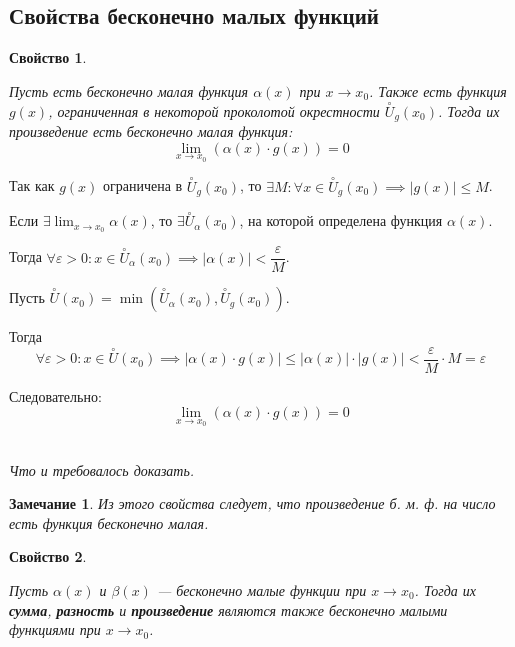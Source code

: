 \documentclass[a4paper,12pt,oneside]{extbook}
\newcommand{\newpar}{$ $\par\nobreak\ignorespaces}
\theoremstyle{numbered}
\newtheorem{property}{Свойство}[section]
\theoremstyle{unnumbered}
\theoremstyle{named}
\theoremstyle{unnumbered}
\theoremstyle{named}
\theoremstyle{named}
\theoremstyle{named}
\newtheorem*{note}{Замечание}
\renewenvironment{proof}[1][]{\breakenv[Доказательство]{\if\relax\detokenize{#1}\relax\else\;\fi}{\textbf{#1}}}{\smallskip\newpar \hfill\textit{Что и требовалось доказать.}}
\begin{document}
\subsection{Свойства бесконечно малых функций}

\begin{property}
    \newpar
    Пусть есть бесконечно малая функция \(\alpha(x)\) при \(x \to x_0\). Также есть функция \(g(x)\), ограниченная в некоторой проколотой окрестности \(\overset{\circ}{U}_g(x_0)\). Тогда их произведение есть бесконечно малая функция:
    \[
        \lim_{x \to x_0}{(\alpha(x) \cdot g(x))} = 0
    \]
\end{property}

\begin{proof}
    Так как \(g(x)\) ограничена в \(\overset{\circ}{U}_g(x_0)\), то \(\exists M: \forall x \in \overset{\circ}{U}_g(x_0) \implies |g(x)| \leq M\).

    Если \(\displaystyle \exists \lim_{x \to x_0}{\alpha(x)}\), то \(\exists \overset{\circ}{U}_\alpha (x_0)\), на которой определена функция \(\alpha(x)\).

    Тогда \(\forall \varepsilon > 0: x \in \overset{\circ}{U}_\alpha(x_0) \implies |\alpha(x)| < \dfrac{\varepsilon}{M}\).

    Пусть \(\overset{\circ}{U}(x_0) = \min(\overset{\circ}{U}_\alpha(x_0), \overset{\circ}{U}_g(x_0))\).

    Тогда
    \[
        \forall \varepsilon > 0: x \in \overset{\circ}{U}(x_0) \implies |\alpha(x) \cdot g(x)| \leq |\alpha(x)| \cdot |g(x)| < \dfrac{\varepsilon}{M} \cdot M = \varepsilon
    \]


    Следовательно:
    \[
        \lim_{x \to x_0}{(\alpha(x) \cdot g(x))} = 0
    \]
\end{proof}

\begin{note}
    Из этого свойства следует, что произведение б. м. ф. на число есть функция бесконечно малая.
\end{note}

\begin{property}
    \newpar
    Пусть \(\alpha(x)\) и \(\beta(x)\) — бесконечно малые функции при \(x \to x_0\). Тогда их \textbf{сумма}, \textbf{разность} и \textbf{произведение} являются также бесконечно малыми функциями при \(x \to x_0\).
\end{property}
\end{document}
